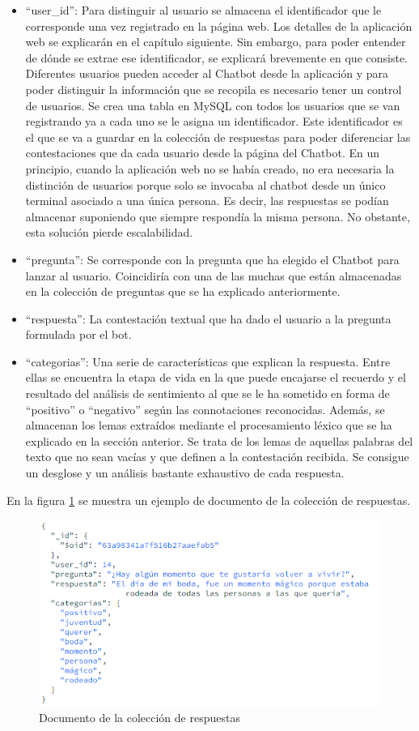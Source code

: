 \begin{itemize}
	\item ``user\_id'': Para distinguir al usuario se almacena el identificador que le corresponde una vez registrado en la página web. Los detalles de la aplicación web se explicarán en el capítulo siguiente. Sin embargo, para poder entender de dónde se extrae ese identificador, se explicará brevemente en que consiste. Diferentes usuarios pueden acceder al Chatbot desde la aplicación y para poder distinguir la información que se recopila es necesario tener un control de usuarios. Se crea una tabla en MySQL con todos los usuarios que se van registrando ya a cada uno se le asigna un identificador. Este identificador es el que se va a guardar en la colección de respuestas para poder diferenciar las contestaciones que da cada usuario desde la página del Chatbot. En un principio, cuando la aplicación web no se había creado, no era necesaria la distinción de usuarios porque solo se invocaba al chatbot desde un único terminal asociado a una única persona. Es decir, las respuestas se podían almacenar suponiendo que siempre respondía la misma persona. No obstante, esta solución pierde escalabilidad. 
	\item ``pregunta'': Se corresponde con la pregunta que ha elegido el Chatbot para lanzar al usuario. Coincidiría con una de las muchas que están almacenadas en la colección de preguntas que se ha explicado anteriormente. 
	\item ``respuesta'': La contestación textual que ha dado el usuario a la pregunta formulada por el bot. 
	\item ``categorias'': Una serie de características que explican la respuesta. Entre ellas se encuentra la etapa de vida en la que puede encajarse el recuerdo y el resultado del análisis de sentimiento al que se le ha sometido en forma de ``positivo'' o ``negativo'' según las connotaciones reconocidas. Además, se almacenan los lemas extraídos mediante el procesamiento léxico que se ha explicado en la sección anterior. Se trata de los lemas de aquellas palabras del texto que no sean vacías y que definen a la contestación recibida. Se consigue un desglose y un análisis bastante exhaustivo de cada respuesta. 
\end{itemize}

En la figura \ref{fig:mongo_resp} se muestra un ejemplo de documento de la colección de respuestas.

\begin{figure}[h]
	\centering
	\includegraphics[scale=0.8]{Imagenes/Vectorial/mongo_respuesta}
	\caption{Documento de la colección de respuestas}
	\label{fig:mongo_resp}
\end{figure}


